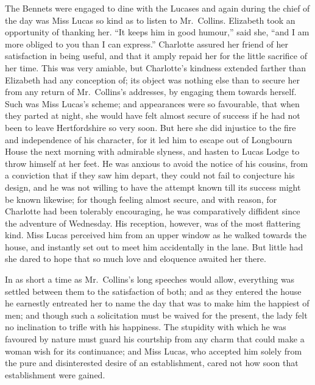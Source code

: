 \documentclass[12pt,english]{book}
\begin{document}
The Bennets were engaged to dine with the Lucases and again during
the chief of the day was Miss Lucas so kind as to listen to Mr.\ Collins.
Elizabeth took an opportunity of thanking her. {}``It keeps him in
good humour,'' said she, {}``and I am more obliged to you than I
can express.'' Charlotte assured her friend of her satisfaction in
being useful, and that it amply repaid her for the little sacrifice
of her time. This was very amiable, but Charlotte's kindness extended
farther than Elizabeth had any conception of; its object was nothing
else than to secure her from any return of Mr.\ Collins's addresses,
by engaging them towards herself. Such was Miss Lucas's scheme; and
appearances were so favourable, that when they parted at night, she
would have felt almost secure of success if he had not been to leave
Hertfordshire so very soon. But here she did injustice to the fire
and independence of his character, for it led him to escape out of
Longbourn House the next morning with admirable slyness, and hasten
to Lucas Lodge to throw himself at her feet. He was anxious to avoid
the notice of his cousins, from a conviction that if they saw him
depart, they could not fail to conjecture his design, and he was not
willing to have the attempt known till its success might be known
likewise; for though feeling almost secure, and with reason, for Charlotte
had been tolerably encouraging, he was comparatively diffident since
the adventure of Wednesday. His reception, however, was of the most
flattering kind. Miss Lucas perceived him from an upper window as
he walked towards the house, and instantly set out to meet him accidentally
in the lane. But little had she dared to hope that so much love and
eloquence awaited her there.

In as short a time as Mr.\ Collins's long speeches would allow, everything
was settled between them to the satisfaction of both; and as they
entered the house he earnestly entreated her to name the day that
was to make him the happiest of men; and though such a solicitation
must be waived for the present, the lady felt no inclination to trifle
with his happiness. The stupidity with which he was favoured by nature
must guard his courtship from any charm that could make a woman wish
for its continuance; and Miss Lucas, who accepted him solely from
the pure and disinterested desire of an establishment, cared not how
soon that establishment were gained.
\end{document}
